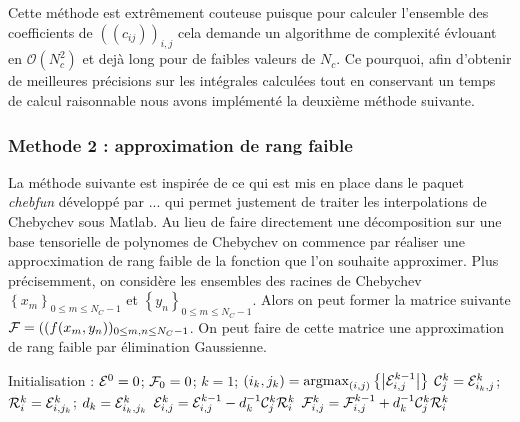\documentclass[10pt]{article}
\begin{document}
\begin{multicols}{2}
Cette méthode est extrêmement couteuse puisque pour calculer l'ensemble des coefficients de $((c_{ij}))_{i,j}$ cela demande un algorithme de complexité évlouant en $\mathcal{O}(N_c^2)$ et dejà long pour de faibles valeurs de $N_c$. Ce pourquoi, afin d'obtenir de meilleures précisions sur les intégrales calculées tout en conservant un temps de calcul raisonnable nous avons implémenté la deuxième méthode suivante.


\subsubsection{Methode 2 : approximation de rang faible}

La méthode suivante est inspirée de ce qui est mis en place dans le paquet \textit{chebfun} développé par ... qui permet justement de traiter les interpolations de Chebychev sous Matlab. Au lieu de faire directement une décomposition sur une base tensorielle de polynomes de Chebychev on commence par réaliser une approcximation de rang faible de la fonction que l'on souhaite approximer. Plus précisemment, on considère les ensembles des racines de Chebychev $\left\{x_m\right\}_{0\le m \le N_C-1}$ et $\left\{y_n\right\}_{0\le m \le N_C-1}$. Alors on peut former la matrice suivante $\mathcal{F}  =((f(x_m, y_n ))_{0\le m,n \le N_C-1}$. On peut faire de cette matrice une approximation de rang faible par élimination Gaussienne.

\begin{algorithm}[H]
  \begin{algorithmic}[1]
    \STATE Initialisation : $\mathcal{E} ^0 = 0$; $\mathcal{F} _0 = 0$; $k = 1$;
    \STATE $(i_k, j_k) =  {\text{argmax}}_{(i,j)} \left\{\left| \mathcal{E} ^{k-1}_{i,j} \right| \right\}$
    \STATE $\mathcal{C} ^k_{j} = \mathcal{E} ^k_{i_k,j}$;  $\mathcal{R} ^k_{i} = \mathcal{E} ^k_{i,j_k}$; $d_k = \mathcal{E} ^k_{i_k,j_k}$
    \STATE $\mathcal{E} ^k_{i,j} = \mathcal{E} ^{k-1}_{i,j} - d_k^{-1}\mathcal{C} ^k_{j}\mathcal{R} ^k_{i}$
    \STATE $\mathcal{F} ^k_{i,j} = \mathcal{F} ^{k-1}_{i,j} + d_k^{-1}\mathcal{C} ^k_{j}\mathcal{R} ^k_{i}$
    \ENDWHILE
  \end{algorithmic}
\end{algorithm}


\end{multicols}
\end{document}
